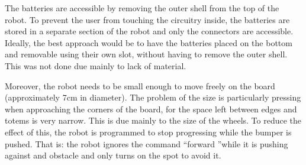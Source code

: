 \documentclass[a4paper,twoside]{book}
\begin{document}
The batteries are accessible by removing the outer shell from the top of the robot. To prevent the user from touching the circuitry inside, the batteries are stored in a separate section of the robot and only the connectors are accessible.
Ideally, the best approach would be to have the batteries placed on the bottom and removable using their own slot, without having to remove the outer shell. This was not done due mainly to lack of material.

Moreover, the robot needs to be small enough to move freely on the board (approximately 7cm in diameter). The problem of the size is particularly pressing when approaching the corners of the board, for the space left between edges and totems is very narrow. This is due mainly to the size of the wheels. To reduce the effect of this, the robot is programmed to stop progressing while the bumper is pushed. That is: the robot ignores the command \textquotedblleft forward \textquotedblright while it is pushing against and obstacle and only turns on the spot to avoid it.
\end{document}
